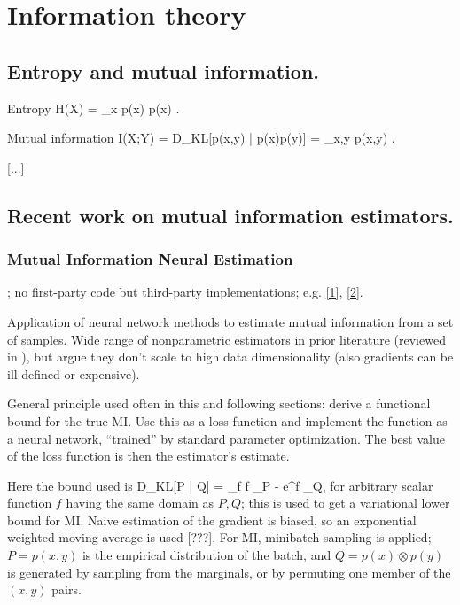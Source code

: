 \documentclass[notitlepage,openany,11pt]{report}
\theoremstyle{plain}%
\numberwithin{equation}{section}
\begin{document}
\section{Information theory}

\subsection{Entropy and mutual information.}

Entropy
\be
H(X) = \sum_{x} p(x) \log p(x) .
\ee

Mutual information
\be
I(X;Y) = D_{KL}[p(x,y) | p(x)p(y)] = \sum_{x,y} p(x,y) \log {}  .
\ee

[...]

\subsection{Recent work on mutual information estimators.}

\subsubsection{Mutual Information Neural Estimation}
\cite{BelghaziEtAl:18}; no first-party code but third-party implementations; e.g. \href{https://github.com/gtegner/mine-pytorch}{[1]}, \href{https://github.com/MasanoriYamada/Mine_pytorch}{[2]}.

Application of neural network methods to estimate mutual information from a set of samples. Wide range of nonparametric estimators in prior literature (reviewed in \cite{Paninski:03}), but argue they don't scale to high data dimensionality (also gradients can be ill-defined or expensive).

General principle used often in this and following sections: derive a functional bound for the true MI. Use this as a loss function and implement the function as a neural network, ``trained'' by standard parameter optimization. The best value of the loss function is then the estimator's estimate.

Here the bound used is
\be
D_{KL}[P | Q] = \sup_{f} \langle f \rangle_{P} - \log \langle e^f \rangle_{Q},
\ee
for arbitrary scalar function $f$ having the same domain as $P,Q$; this is used to get a variational lower bound for MI. Naive estimation of the gradient is biased, so an exponential weighted moving average is used [???]. For MI, minibatch sampling is applied; $P = p(x,y)$ is the empirical distribution of the batch, and $Q = p(x) \otimes p(y)$ is generated by sampling from the marginals, or by permuting one member of the $(x,y)$ pairs. 
\end{document}

